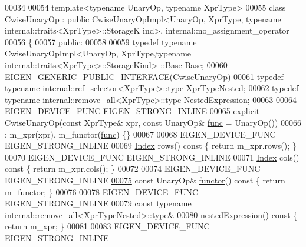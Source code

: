 \begin{DoxyCode}
00034 
00054 \textcolor{keyword}{template}<\textcolor{keyword}{typename} UnaryOp, \textcolor{keyword}{typename} XprType>
00055 \textcolor{keyword}{class }CwiseUnaryOp : \textcolor{keyword}{public} CwiseUnaryOpImpl<UnaryOp, XprType, typename internal::traits<XprType>::StorageK
      ind>, internal::no\_assignment\_operator
00056 \{
00057   \textcolor{keyword}{public}:
00058 
00059     \textcolor{keyword}{typedef} \textcolor{keyword}{typename} CwiseUnaryOpImpl<UnaryOp, XprType,typename internal::traits<XprType>::StorageKind>
      ::Base Base;
00060     EIGEN\_GENERIC\_PUBLIC\_INTERFACE(CwiseUnaryOp)
00061     \textcolor{keyword}{typedef} \textcolor{keyword}{typename} internal::ref\_selector<XprType>::type XprTypeNested;
00062     \textcolor{keyword}{typedef} \textcolor{keyword}{typename} internal::remove\_all<XprType>::type NestedExpression;
00063 
00064     EIGEN\_DEVICE\_FUNC EIGEN\_STRONG\_INLINE
00065     \textcolor{keyword}{explicit} CwiseUnaryOp(\textcolor{keyword}{const} XprType& xpr, \textcolor{keyword}{const} UnaryOp& \hyperlink{structfunc}{func} = UnaryOp())
00066       : m\_xpr(xpr), m\_functor(\hyperlink{structfunc}{func}) \{\}
00067 
00068     EIGEN\_DEVICE\_FUNC EIGEN\_STRONG\_INLINE
00069     \hyperlink{namespace_eigen_a62e77e0933482dafde8fe197d9a2cfde}{Index} rows()\textcolor{keyword}{ const }\{ \textcolor{keywordflow}{return} m\_xpr.rows(); \}
00070     EIGEN\_DEVICE\_FUNC EIGEN\_STRONG\_INLINE
00071     \hyperlink{namespace_eigen_a62e77e0933482dafde8fe197d9a2cfde}{Index} cols()\textcolor{keyword}{ const }\{ \textcolor{keywordflow}{return} m\_xpr.cols(); \}
00072 
00074     EIGEN\_DEVICE\_FUNC EIGEN\_STRONG\_INLINE
\hyperlink{group___core___module_ac02eff03893317021760f7d093c4ab9d}{00075}     \textcolor{keyword}{const} UnaryOp& \hyperlink{group___core___module_ac02eff03893317021760f7d093c4ab9d}{functor}()\textcolor{keyword}{ const }\{ \textcolor{keywordflow}{return} m\_functor; \}
00076 
00078     EIGEN\_DEVICE\_FUNC EIGEN\_STRONG\_INLINE
00079     \textcolor{keyword}{const} \textcolor{keyword}{typename} \hyperlink{group___sparse_core___module}{internal::remove\_all<XprTypeNested>::type}&
\hyperlink{group___core___module_a25d4402be360cf0b8ff867863da46c7d}{00080}     \hyperlink{group___core___module_a25d4402be360cf0b8ff867863da46c7d}{nestedExpression}()\textcolor{keyword}{ const }\{ \textcolor{keywordflow}{return} m\_xpr; \}
00081 
00083     EIGEN\_DEVICE\_FUNC EIGEN\_STRONG\_INLINE

\end{DoxyCode}
